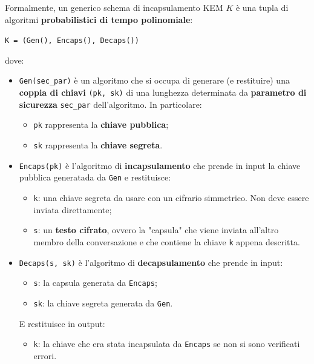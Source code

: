 \documentclass[a4paper, 12pt, oneside]{article}
\theoremstyle{definition}
\begin{document}
Formalmente, un generico schema di incapsulamento KEM $K$ è una tupla di algoritmi \textbf{probabilistici di tempo polinomiale}:

\begin{center}
    \texttt{K = (Gen(), Encaps(), Decaps())}
\end{center}

dove:

\begin{itemize}
    \item \texttt{Gen(sec\_par)} è un algoritmo che si occupa di generare (e restituire) una \textbf{coppia di chiavi} \texttt{(pk, sk)} di una lunghezza determinata da \textbf{parametro di sicurezza} \texttt{sec\_par} dell'algoritmo. In particolare: \begin{itemize}
        \item \texttt{pk} rappresenta la \textbf{chiave pubblica};
        \item \texttt{sk} rappresenta la \textbf{chiave segreta}.
    \end{itemize}
    \item \texttt{Encaps(pk)} è l'algoritmo di \textbf{incapsulamento} che prende in input la chiave pubblica generatada da \texttt{Gen} e restituisce: \begin{itemize}
        \item \texttt{k}: una chiave segreta da usare con un cifrario simmetrico. Non deve essere inviata direttamente;
        \item \texttt{s}: un \textbf{testo cifrato}, ovvero la "capsula" che viene inviata all'altro membro della conversazione e che contiene la chiave \texttt{k} appena descritta.
    \end{itemize}
    \item \texttt{Decaps(s, sk)} è l'algoritmo di \textbf{decapsulamento} che prende in input: \begin{itemize}
        \item \texttt{s}: la capsula generata da \texttt{Encaps};
        \item \texttt{sk}: la chiave segreta generata da \texttt{Gen}.
    \end{itemize}

    E restituisce in output: \begin{itemize}
        \item \texttt{k}: la chiave che era stata incapsulata da \texttt{Encaps} se non si sono verificati errori.
    \end{itemize}
\end{itemize}
\end{document}
